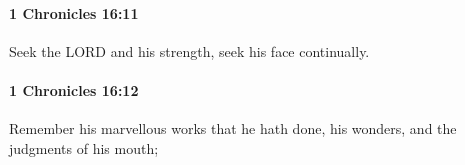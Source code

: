 		\paragraph{1 Chronicles 16:11} %
			\label{1CHRONICLES-16-11}

			Seek the LORD and his strength, seek his face continually.


		\paragraph{1 Chronicles 16:12} %
			\label{1CHRONICLES-16-12}

			Remember his marvellous works that he hath done, his wonders, and the judgments of his mouth;


